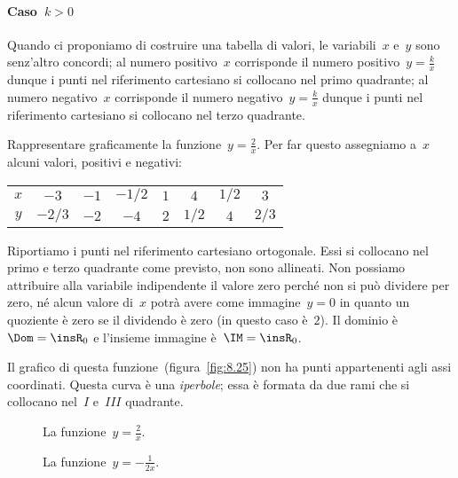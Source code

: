 \paragraph{Caso~$k>0$} Quando ci proponiamo di costruire una tabella di valori, le variabili~$x$ e~$y$ sono
senz'altro concordi; al numero positivo~$x$ corrisponde il numero positivo~$y=\frac{k}{x}$ dunque i punti
nel riferimento cartesiano si collocano nel primo quadrante; al numero negativo~$x$ corrisponde il numero
negativo~$y=\frac{k}{x}$ dunque i punti nel riferimento cartesiano si collocano nel terzo quadrante.
\begin{exrig}
 \begin{esempio}
Rappresentare graficamente la funzione~$y=\frac{2}{x}$.
Per far questo assegniamo a~$x$ alcuni valori, positivi e negativi:
\begin{center}
 \begin{tabular}{cccccccc}
 \toprule
 $x$ & $-3$ & $-1$ & $-1/2$ & $1$ & $4$& $1/2$ & $3$\\
 $y$ & $-2/3$ & $-2$ & $-4$ & $2$ & $1/2$& $4$ & $2/3$\\
 \bottomrule
 \end{tabular}
\end{center}
Riportiamo i punti nel riferimento cartesiano ortogonale. Essi si collocano nel primo e terzo quadrante come previsto,
non sono allineati. Non possiamo attribuire alla variabile indipendente il valore zero perché non si può dividere per zero,
né alcun valore di~$x$ potrà avere come immagine~$y=0$ in quanto un quoziente è zero se il dividendo è zero (in questo caso è~$2$).
Il dominio è~$\Dom=\insR_{0}$ e l'insieme immagine è~$\IM=\insR_{0}$.

Il grafico di questa funzione~(figura~\ref{fig:8.25}) non ha punti appartenenti agli assi coordinati.
Questa curva è una \emph{iperbole}; essa è formata da due rami che si collocano nel~$I$ e~$III$ quadrante.
 \end{esempio}
\end{exrig}

\begin{figure}[htb]
\begin{minipage}[b]{.45\textwidth}
\centering
\caption{La funzione~$y=\frac{2}{x}$.}\label{fig:8.25}
\end{minipage}\hfil
\begin{minipage}[b]{.45\textwidth}
\centering
\caption{La funzione~$y=-\frac{1}{2x}$.}\label{fig:8.26}
\end{minipage}
\end{figure}


